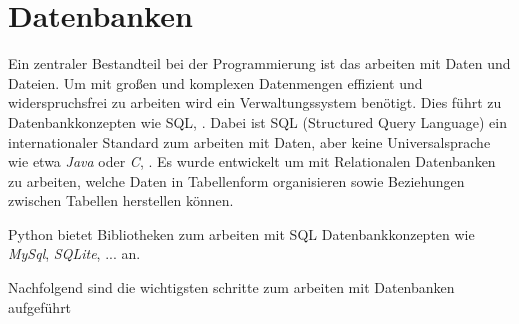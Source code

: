 \chapter{Datenbanken}

Ein zentraler Bestandteil bei der Programmierung ist das arbeiten mit Daten und Dateien. Um mit großen und komplexen Datenmengen effizient und widerspruchsfrei zu arbeiten wird ein Verwaltungssystem benötigt. Dies führt zu Datenbankkonzepten wie SQL, \cite{Steyer:2018}.
Dabei ist SQL (Structured Query Language) ein internationaler Standard zum arbeiten mit Daten, aber keine Universalsprache wie etwa \textit{Java} oder \textit{C}, \cite{Taylor:2023}. Es wurde entwickelt um mit Relationalen Datenbanken zu arbeiten, welche Daten in Tabellenform organisieren sowie Beziehungen zwischen Tabellen herstellen können.

Python bietet Bibliotheken zum arbeiten mit SQL Datenbankkonzepten wie \textit{MySql}, \textit{SQLite}, ... an.

Nachfolgend sind die wichtigsten schritte zum arbeiten mit Datenbanken aufgeführt